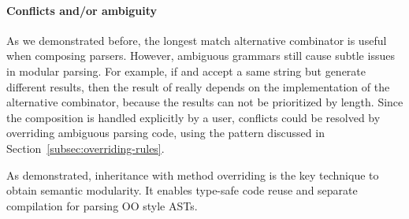\paragraph{Conflicts and/or ambiguity} As we demonstrated before, the longest match alternative combinator is useful when composing parsers. However, ambiguous grammars still cause subtle issues in modular parsing. For example, if  and  accept a same string but generate different results, then the result of  really depends on the implementation of the alternative combinator, because the results can not be prioritized by length. Since the composition is handled explicitly by a user, conflicts could be resolved by overriding ambiguous parsing code, using the pattern discussed in Section~\ref{subsec:overriding-rules}.

As demonstrated, inheritance with method overriding is the key
technique to obtain semantic modularity.  It enables type-safe code
reuse and separate compilation for parsing OO style ASTs.

